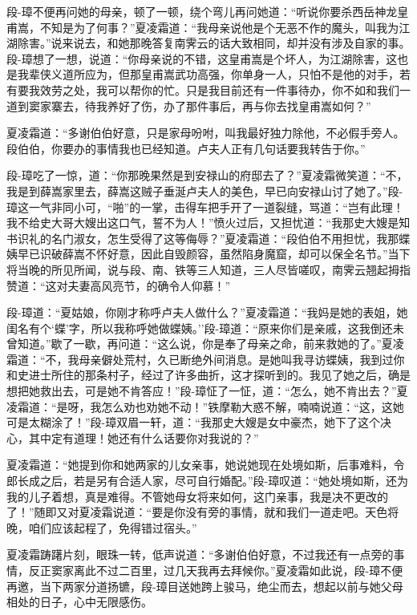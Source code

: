 \documentclass[12pt,oneside]{book}
\begin{document}
段-璋不便再问她的母亲，顿了一顿，绕个弯儿再问她道：``听说你要杀西岳神龙皇甫嵩，不知是为了何事？''夏凌霜道：``我母亲说他是个无恶不作的魔头，叫我为江湖除害。''说来说去，和她那晚答复南霁云的话大致相同，却并没有涉及自家的事。段-璋想了一想，说道：``你母亲说的不错，这皇甫嵩是个坏人，为江湖除害，这也是我辈侠义道所应为，但那皇甫嵩武功高强，你单身一人，只怕不是他的对手，若有要我效劳之处，我可以帮你的忙。只是我目前还有一件事待办，你不如和我们一道到窦家寨去，待我养好了伤，办了那件事后，再与你去找皇甫嵩如何？''

夏凌霜道：``多谢伯伯好意，只是家母吩咐，叫我最好独力除他，不必假手旁人。段伯伯，你要办的事情我也已经知道。卢夫人正有几句话要我转告于你。''

段-璋吃了一惊，道：``你那晚果然是到安禄山的府邸去了？''夏凌霜微笑道：``不，我是到薛嵩家里去，薛嵩这贼子垂涎卢夫人的美色，早已向安禄山讨了她了。''段-璋这一气非同小可，``啪''的一掌，击得车把手开了一道裂缝，骂道：``岂有此理！我不给史大哥大嫂出这口气，誓不为人！''愤火过后，又担忧道：``我那史大嫂是知书识礼的名门淑女，怎生受得了这等侮辱？''夏凌霜道：``段伯伯不用担忧，我那蝶姨早已识破薛嵩不怀好意，因此自毁颜容，虽然陷身魔窟，却可以保全名节。''当下将当晚的所见所闻，说与段、南、铁等三人知道，三人尽皆嗟叹，南霁云翘起拇指赞道：``这对夫妻高风亮节，的确令人仰慕！''

段-璋道：``夏姑娘，你刚才称呼卢夫人做什么？''夏凌霜道：``我妈是她的表姐，她闺名有个`蝶'字，所以我称呼她做蝶姨。''段-璋道：``原来你们是亲戚，这我倒还未曾知道。''歇了一歇，再问道：``这么说，你是奉了母亲之命，前来救她的了。''夏凌霜道：``不，我母亲僻处荒村，久已断绝外间消息。是她叫我寻访蝶姨，我到过你和史进士所住的那条村子，经过了许多曲折，这才探听到的。我见了她之后，确是想把她救出去，可是她不肯答应！''段-璋怔了一怔，道：``怎么，她不肯出去？''夏凌霜道：``是呀，我怎么劝也劝她不动！''铁摩勒大惑不解，喃喃说道：``这，这她可是太糊涂了！''段-璋双眉一轩，道：``我那史大嫂是女中豪杰，她下了这个决心，其中定有道理！她还有什么话要你对我说的？''

夏凌霜道：``她提到你和她两家的儿女亲事，她说她现在处境如斯，后事难料，令郎长成之后，若是另有合适人家，尽可自行婚配。''段-璋叹道：``她处境如斯，还为我的儿子着想，真是难得。不管她母女将来如何，这门亲事，我是决不更改的了！''随即又对夏凌霜说道：``要是你没有旁的事情，就和我们一道走吧。天色将晚，咱们应该起程了，免得错过宿头。''

夏凌霜踌躇片刻，眼珠一转，低声说道：``多谢伯伯好意，不过我还有一点旁的事情，反正窦家离此不过二百里，过几天我再去拜候你。''夏凌霜如此说，段-璋不便再邀，当下两家分道扬镳，段-璋目送她跨上骏马，绝尘而去，想起以前与她父母相处的日子，心中无限感伤。
\end{document}
